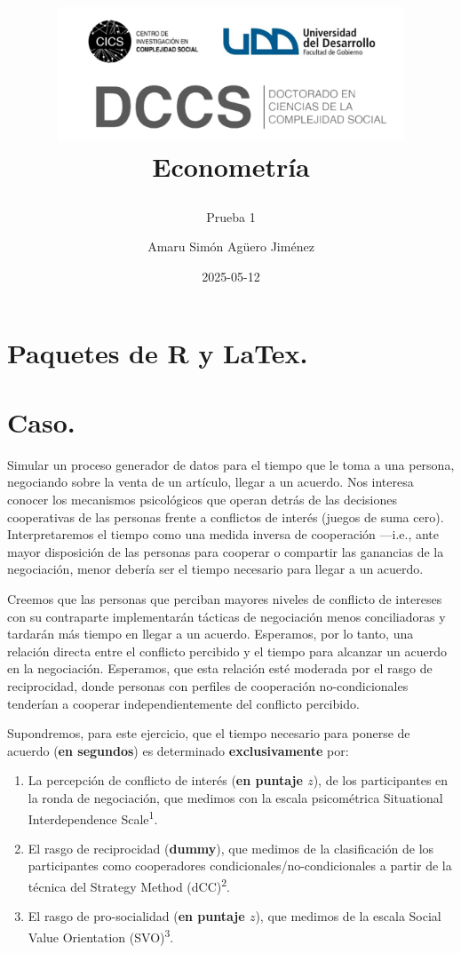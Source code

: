\documentclass[
  spanish,
  10pt,
]{article}
\title{\begin{center}
  \includegraphics[height=4cm]{logo.png} \\[1cm]
  \Large Econometría \\
\end{center}}
\subtitle{Prueba 1}
\author{Amaru Simón Agüero Jiménez}
\date{2025-05-12}
\renewcommand*\contentsname{Tabla de contenidos}
\newcommand\contentsname{Tabla de contenidos}
\begin{document}
\maketitle

\renewcommand*\contentsname{Tabla de contenidos}
{
\hypersetup{linkcolor=}
\setcounter{tocdepth}{3}
\tableofcontents
}

\section{Paquetes de R y LaTex.}\label{paquetes-de-r-y-latex.}

\section{Caso.}\label{caso.}

Simular un proceso generador de datos para el tiempo que le toma a una
persona, negociando sobre la venta de un artículo, llegar a un acuerdo.
Nos interesa conocer los mecanismos psicológicos que operan detrás de
las decisiones cooperativas de las personas frente a conflictos de
interés (juegos de suma cero). Interpretaremos el tiempo como una medida
inversa de cooperación ---i.e., ante mayor disposición de las personas
para cooperar o compartir las ganancias de la negociación, menor debería
ser el tiempo necesario para llegar a un acuerdo.

Creemos que las personas que perciban mayores niveles de conflicto de
intereses con su contraparte implementarán tácticas de negociación menos
conciliadoras y tardarán más tiempo en llegar a un acuerdo. Esperamos,
por lo tanto, una relación directa entre el conflicto percibido y el
tiempo para alcanzar un acuerdo en la negociación. Esperamos, que esta
relación esté moderada por el rasgo de reciprocidad, donde personas con
perfiles de cooperación no-condicionales tenderían a cooperar
independientemente del conflicto percibido.

Supondremos, para este ejercicio, que el tiempo necesario para ponerse
de acuerdo (\textbf{en segundos}) es determinado \textbf{exclusivamente}
por:

\begin{enumerate}
\def\labelenumi{\arabic{enumi}.}
\item
  La percepción de conflicto de interés (\textbf{en puntaje \(z\)}), de
  los participantes en la ronda de negociación, que medimos con la
  escala psicométrica Situational Interdependence
  Scale\textsuperscript{1}.
\item
  El rasgo de reciprocidad (\textbf{dummy}), que medimos de la
  clasificación de los participantes como cooperadores
  condicionales/no-condicionales a partir de la técnica del Strategy
  Method (dCC)\textsuperscript{2}.
\item
  El rasgo de pro-socialidad (\textbf{en puntaje \(z\)}), que medimos de
  la escala Social Value Orientation (SVO)\textsuperscript{3}.
\end{enumerate}
\end{document}
